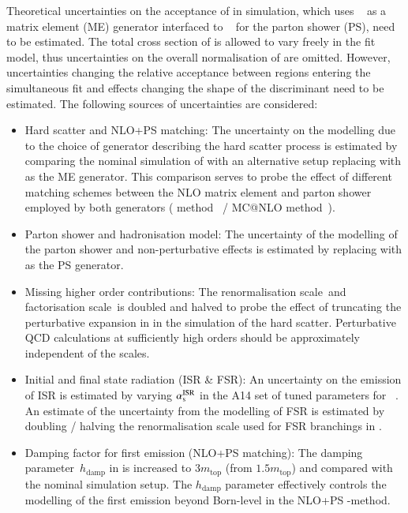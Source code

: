Theoretical uncertainties on the acceptance of \ttbar in simulation,
which uses \POWHEGBOX[v2]~\cite{Frixione:2007nw} as a matrix element
(ME) generator interfaced to \PYTHIA[8.230]~\cite{Sjostrand:2014zea}
for the parton shower (PS), need to be estimated. The total cross
section of \ttbar is allowed to vary freely in the fit model, thus
uncertainties on the overall normalisation of \ttbar are
omitted. However, uncertainties changing the relative acceptance
between regions entering the simultaneous fit and effects changing the
shape of the \mTW discriminant need to be estimated. The following
sources of uncertainties are considered:
\begin{itemize}

\item Hard scatter and NLO+PS matching: The uncertainty on the
  modelling due to the choice of generator describing the hard scatter
  process is estimated by comparing the nominal simulation of \ttbar
  with an alternative setup replacing \POWHEGBOX[v2] with \MGNLO as
  the ME generator. This comparison serves to probe the effect of
  different matching schemes between the NLO matrix element and parton
  shower employed by both generators (\POWHEG
  method~\cite{Nason:2004rx,Frixione:2007vw,Alioli:2010xd} / MC@NLO
  method~\cite{Frixione:2002ik}).

\item Parton shower and hadronisation model: The uncertainty of the
  modelling of the parton shower and non-perturbative effects is
  estimated by replacing \PYTHIA[8] with \HERWIG[7.0.4] as the PS
  generator.

\item Missing higher order contributions: The renormalisation
  scale~\muR and factorisation scale~\muF is doubled and halved to
  probe the effect of truncating the perturbative expansion in \alphas
  in the simulation of the hard scatter. Perturbative QCD calculations
  at sufficiently high orders should be approximately independent of
  the scales.

\item Initial and final state radiation (ISR \& FSR): An uncertainty
  on the emission of ISR is estimated by varying $\alpha_{\text{s}}^\text{ISR}$
  in the A14 set of tuned parameters for
  \PYTHIA[8]~\cite{ATL-PHYS-PUB-2014-021}.
  An estimate of the uncertainty from the modelling of FSR is
  estimated by doubling / halving the renormalisation scale used for
  FSR branchings in \PYTHIA[8].

\item Damping factor for first emission (NLO+PS matching): The damping
  parameter~$h_\text{damp}$ in \POWHEGBOX[v2] is increased to
  $3 m_\text{top}$ (from $1.5 m_\text{top}$) and compared with the
  nominal simulation setup. The $h_\text{damp}$ parameter effectively
  controls the modelling of the first emission beyond Born-level in
  the NLO+PS \POWHEG-method.
\end{itemize}
